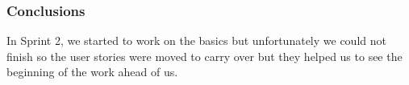 \subsubsection{Conclusions}

In Sprint 2, we started to work on the basics but unfortunately 
we could not finish so the user stories were moved to carry over 
but they helped us to see the beginning of the work ahead of us.
